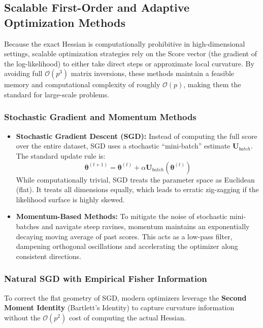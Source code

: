 \documentclass[
  letterpaper,
  DIV=11,
  numbers=noendperiod]{scrreprt}
\renewcommand{\[}{\begin{equation}}
\renewcommand{\]}{\end{equation}}
\theoremstyle{definition}
\theoremstyle{plain}
\theoremstyle{plain}
\theoremstyle{plain}
\theoremstyle{definition}
\theoremstyle{plain}
\theoremstyle{remark}
\begin{document}
\subsection{Scalable First-Order and Adaptive Optimization
Methods}\label{scalable-first-order-and-adaptive-optimization-methods}

Because the exact Hessian is computationally prohibitive in
high-dimensional settings, scalable optimization strategies rely on the
Score vector (the gradient of the log-likelihood) to either take direct
steps or approximate local curvature. By avoiding full
\(\mathcal{O}(p^3)\) matrix inversions, these methods maintain a
feasible memory and computational complexity of roughly
\(\mathcal{O}(p)\), making them the standard for large-scale problems.

\subsubsection{Stochastic Gradient and Momentum
Methods}\label{stochastic-gradient-and-momentum-methods}

\begin{itemize}
\item
  \textbf{Stochastic Gradient Descent (SGD):} Instead of computing the
  full score over the entire dataset, SGD uses a stochastic
  ``mini-batch'' estimate \(\mathbf{U}_{batch}\). The standard update
  rule is: \[
    \boldsymbol{\theta}^{(t+1)} = \boldsymbol{\theta}^{(t)} + \alpha \mathbf{U}_{batch}(\boldsymbol{\theta}^{(t)})
    \] While computationally trivial, SGD treats the parameter space as
  Euclidean (flat). It treats all dimensions equally, which leads to
  erratic zig-zagging if the likelihood surface is highly skewed.
\item
  \textbf{Momentum-Based Methods:} To mitigate the noise of stochastic
  mini-batches and navigate steep ravines, momentum maintains an
  exponentially decaying moving average of past scores. This acts as a
  low-pass filter, dampening orthogonal oscillations and accelerating
  the optimizer along consistent directions.
\end{itemize}

\subsubsection{Natural SGD with Empirical Fisher
Information}\label{natural-sgd-with-empirical-fisher-information}

To correct the flat geometry of SGD, modern optimizers leverage the
\textbf{Second Moment Identity} (Bartlett's Identity) to capture
curvature information without the \(\mathcal{O}(p^2)\) cost of computing
the actual Hessian.
\end{document}
